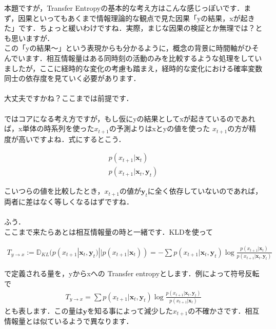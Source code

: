 \documentclass[11pt,a4paper,dvipdfmx]{ujreport}
\begin{document}
本題ですが，Transfer Entropyの基本的な考え方はこんな感じっぽいです．まず，因果といってもあくまで情報理論的な観点で見た因果「yの結果，xが起きた」です．ちょっと緩いわけですね．実際，まじな因果の検証とか無理では？とも思いますが．\\

この「yの結果～」という表現からも分かるように，概念の背景に時間軸がひそんでいます．相互情報量はある同時刻の活動のみを比較するような処理をしていましたが，ここに経時的な変化の考慮も踏まえ，経時的な変化における確率変数同士の依存度を見ていく必要があります．\\
\\

大丈夫ですかね？ここまでは前提です．\\
\\

ではコアになる考え方ですが，もし仮にyの結果としてxが起きているのであれば，x単体の時系列を使った$x_{t+1}$の予測よりはxとyの値を使った $x_{t+1}$の方が精度が高いですよね．式にするとこう．

\begin{eqnarray}
\label{eq:TL1}
  p(x_{t+1}| \mathbf{x}_t) \nonumber \\
  p(x_{t+1}| \mathbf{x}_t, \mathbf{y}_t) \nonumber
\end{eqnarray}

こいつらの値を比較したとき，$x_{t+1}$の値が$\mathbf{y}_t$に全く依存していないのであれば，両者に差はなく等しくなるはずですね．\\
\\

ふう．
\\

ここまで来たらあとは相互情報量の時と一緒です．KLDを使って

\begin{eqnarray}
\label{eq:TE1}
  T_{y\rightarrow x} := \mathbb{D}_{KL}(p(x_{t+1}| \mathbf{x}_t, \mathbf{y}_t) || p(x_{t+1}| \mathbf{x}_t)) = -\sum p(x_{t+1}| \mathbf{x}_t, \mathbf{y}_t) \log \frac{p(x_{t+1}| \mathbf{x}_t)}{p(x_{t+1}| \mathbf{x}_t, \mathbf{y}_t)} 
\end{eqnarray}

で定義される量を，yからxへの Transfer entropyとします．例によって符号反転で
\begin{eqnarray}
\label{eq:TE2}
  T_{y\rightarrow x} = \sum p(x_{t+1}| \mathbf{x}_t, \mathbf{y}_t) \log \frac{p(x_{t+1}| \mathbf{x}_t, \mathbf{y}_t)}{p(x_{t+1}| \mathbf{x}_t)} 
\end{eqnarray}
とも表します．この量は$\mathbf{y}$を知る事によって減少した$x_{t+1}$の不確かさです．相互情報量とは似ているようで異なります．\\
\\
\end{document}
